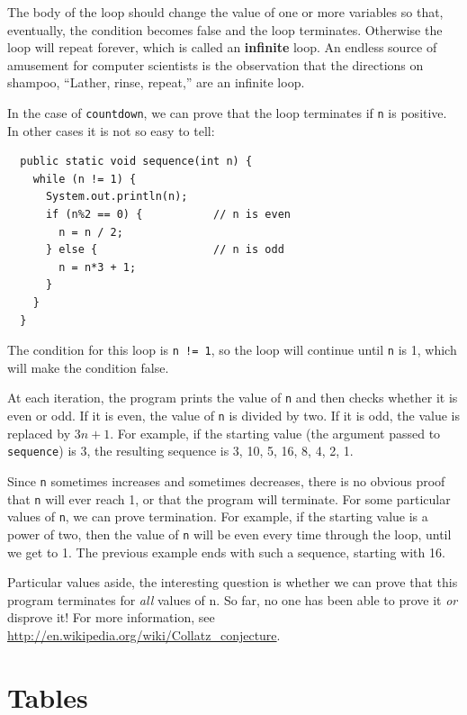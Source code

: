 \documentclass[12pt]{book}
\theoremstyle{exercise}
\begin{document}

The body of the loop should change the value of
one or more variables so that, eventually, the condition becomes
false and the loop terminates.  Otherwise the loop will repeat
forever, which is called an {\bf infinite} loop.  An endless
source of amusement for computer scientists is the observation
that the directions on shampoo, ``Lather, rinse, repeat,'' are
an infinite loop.

In the case of {\tt countdown}, we can prove that the loop
terminates if {\tt n} is positive.
%
In other cases it is not so easy to tell:

\begin{lstlisting}
  public static void sequence(int n) {
    while (n != 1) {
      System.out.println(n);
      if (n%2 == 0) {           // n is even
        n = n / 2;
      } else {                  // n is odd
        n = n*3 + 1;
      }
    }
  }
\end{lstlisting}
%
The condition for this loop is {\tt n != 1}, so the loop
will continue until {\tt n} is 1, which will make the condition
false.

At each iteration, the program prints the value of {\tt n} and then
checks whether it is even or odd.  If it is even, the value of
{\tt n} is divided by two.  If it is odd, the value is replaced
by $3n+1$.  For example, if the starting value (the argument passed
to {\tt sequence}) is 3, the resulting sequence is
3, 10, 5, 16, 8, 4, 2, 1.

Since {\tt n} sometimes increases and sometimes decreases, there is no
obvious proof that {\tt n} will ever reach 1, or that the program will
terminate.  For some particular values of {\tt n}, we can prove
termination.  For example, if the starting value is a power of two, then
the value of {\tt n} will be even every time through the loop, until
we get to 1.  The previous example ends with such a sequence,
starting with 16.

Particular values aside, the interesting question is whether
we can prove that this program terminates for {\em all} values of n.
So far, no one has been able to prove it {\em or} disprove it!
For more information, see \url{http://en.wikipedia.org/wiki/Collatz_conjecture}.


\section{Tables}
\end{document}
